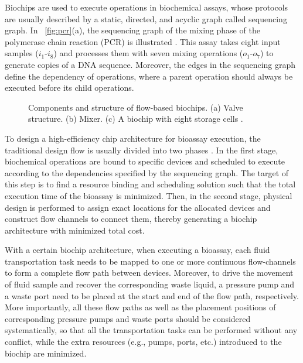 Biochips are used to execute operations in biochemical assays, whose protocols are usually described by a static, directed, and acyclic graph called sequencing graph. In
\figname~\ref{fig:pcr}(a), the sequencing graph of
the mixing phase of the polymerase chain reaction (PCR) is illustrated \cite{zhang2002microelectrofluidic}. This assay takes eight input samples ($i_1$-$i_8$) and processes them with seven mixing operations ($o_1$-$o_7$) to generate copies
of a DNA sequence. Moreover, the edges in the sequencing graph define the dependency of
operations, where a parent operation should always be executed before its child operations.

\begin{figure}[t]
{\figurefontsize
\centering

\caption{Components and structure of flow-based biochips. (a)
Valve structure. (b) Mixer. (c) A biochip with eight storage cells \cite{AminTA09}.}
\label{fig:valve_mixer_storage}
}
\vspace{-0.5cm}
\end{figure}

To design a high-efficiency chip architecture for bioassay execution, the traditional design flow is usually divided into two phases \cite{MinhassPMB12}. In the first stage, biochemical operations are bound to specific devices and scheduled to execute according to the dependencies specified by the sequencing graph. The target of this step is to find a resource binding and scheduling solution such that the total execution time of the bioassay is minimized. Then, in the second stage, physical design is performed to assign exact locations for the allocated devices and construct flow channels to connect them, thereby generating a biochip architecture with minimized total cost.

With a certain biochip architecture, when executing a bioassay, each fluid transportation task needs to be mapped to one or more continuous flow-channels to form a complete flow path between devices. Moreover, to drive the movement of fluid sample and recover the corresponding waste liquid, a pressure pump and a waste port need to be placed at the start and end of the flow path, respectively. More importantly, all these flow paths as well as the placement positions of corresponding pressure pumps and waste ports should be considered systematically, so that all the transportation tasks can be performed without any conflict, while the extra resources (e.g., pumps, ports, etc.) introduced to the biochip are minimized.

